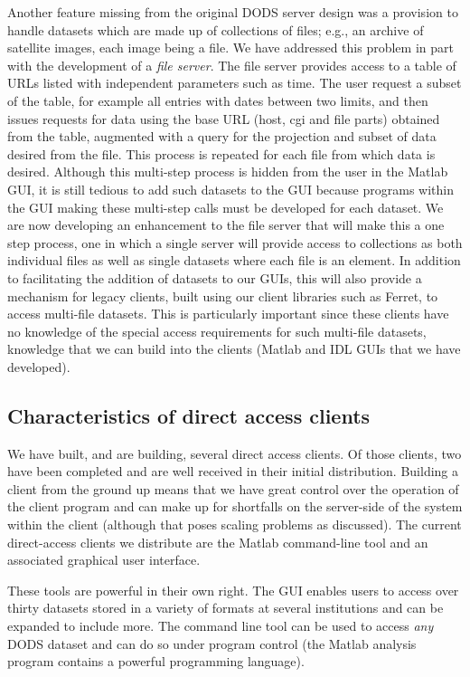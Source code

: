 \documentclass{article}
\begin{document}
Another feature missing from the original \ac{DODS} server design was a
provision to handle datasets which are made up of collections of files; e.g.,
an archive of satellite images, each image being a file. We have addressed
this problem in part with the development of a \emph{file server}. The file
server provides access to a table of \acs{URL}s listed with independent
parameters such as time. The user request a subset of the table, for example
all entries with dates between two limits, and then issues requests for data
using the base \acs{URL} (host, cgi and file parts) obtained from the table,
augmented with a query for the projection and subset of data desired from the
file. This process is repeated for each file from which data is desired.
Although this multi-step process is hidden from the user in the Matlab
\acs{GUI}, it is still tedious to add such datasets to the \acs{GUI} because
programs within the \acs{GUI} making these multi-step calls must be developed
for each dataset. We are now developing an enhancement to the file server
that will make this a one step process, one in which a single server will
provide access to collections as both individual files as well as single
datasets where each file is an element. In addition to facilitating the
addition of datasets to our \acs{GUI}s, this will also provide a mechanism
for legacy clients, built using our client libraries such as Ferret, to
access multi-file datasets. This is particularly important since these
clients have no knowledge of the special access requirements for such
multi-file datasets, knowledge that we can build into the clients (Matlab and
IDL \acs{GUI}s that we have developed).

\subsection{Characteristics of direct access clients}
\label{dclients}

We have built, and are building, several direct access clients. Of those
clients, two have been completed and are well received in their initial
distribution. Building a client from the ground up means that we have great
control over the operation of the client program and can make up for
shortfalls on the server-side of the system within the client (although that
poses scaling problems as discussed). The current direct-access clients we
distribute are the Matlab command-line tool and an associated graphical user
interface.

These tools are powerful in their own right. The \ac{GUI} enables users to
access over thirty datasets stored in a variety of formats at several
institutions and can be expanded to include more. The command line tool can
be used to access \emph{any} \ac{DODS} dataset and can do so under program
control (the Matlab analysis program contains a powerful programming
language).
\end{document}
